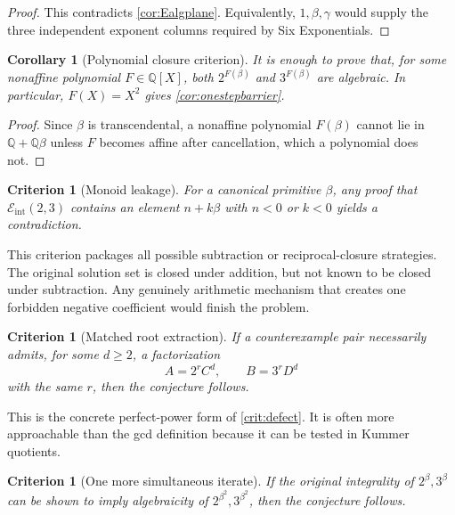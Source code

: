 \documentclass[11pt]{article}
\numberwithin{equation}{section}
\newtheorem{corollary}[theorem]{Corollary}
\newtheorem{criterion}[theorem]{Criterion}
\theoremstyle{definition}
\newcommand{\Q}{\mathbb{Q}}
\newcommand{\Eint}{\mathcal E_{\mathrm{int}}}
\begin{document}
\begin{proof}
This contradicts \cref{cor:Ealgplane}. Equivalently, \(1,\beta,\gamma\) would supply the three independent exponent columns required by Six Exponentials.
\end{proof}

\begin{corollary}[Polynomial closure criterion]\label{cor:polyclosure}
It is enough to prove that, for some nonaffine polynomial \(F\in\Q[X]\), both \(2^{F(\beta)}\) and \(3^{F(\beta)}\) are algebraic. In particular, \(F(X)=X^2\) gives \cref{cor:onestepbarrier}.
\end{corollary}

\begin{proof}
Since \(\beta\) is transcendental, a nonaffine polynomial \(F(\beta)\) cannot lie in \(\Q+\Q\beta\) unless \(F\) becomes affine after cancellation, which a polynomial does not.
\end{proof}

\begin{criterion}[Monoid leakage]\label{crit:leakage}
For a canonical primitive \(\beta\), any proof that \(\Eint(2,3)\) contains an element \(n+k\beta\) with \(n<0\) or \(k<0\) yields a contradiction.
\end{criterion}

This criterion packages all possible subtraction or reciprocal-closure strategies. The original solution set is closed under addition, but not known to be closed under subtraction. Any genuinely arithmetic mechanism that creates one forbidden negative coefficient would finish the problem.

\begin{criterion}[Matched root extraction]\label{crit:root}
If a counterexample pair necessarily admits, for some \(d\ge2\), a factorization
\[
       A=2^rC^d,
       \qquad
       B=3^rD^d
\]
with the same \(r\), then the conjecture follows.
\end{criterion}

This is the concrete perfect-power form of \cref{crit:defect}. It is often more approachable than the gcd definition because it can be tested in Kummer quotients.

\begin{criterion}[One more simultaneous iterate]\label{crit:iterate}
If the original integrality of \(2^\beta,3^\beta\) can be shown to imply algebraicity of \(2^{\beta^2},3^{\beta^2}\), then the conjecture follows.
\end{criterion}
\end{document}
